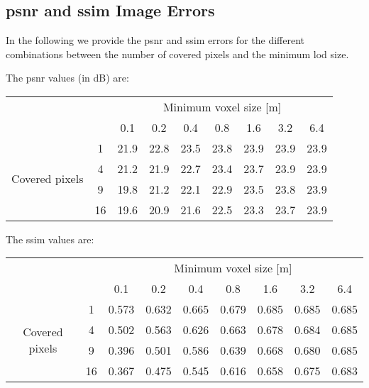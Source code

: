\chapter{}

\section{\acs{psnr} and \acs{ssim} Image Errors}
\label{sec:psnr_and_ssim_errors}
In the following we provide the \ac{psnr} and \ac{ssim} errors for the different combinations between the number of covered pixels and the minimum \ac{lod} size.

The \ac{psnr} values (in dB) are:
\begin{center}
    \begin{tabular}{| c | c | c | c | c | c | c | c | c |}
        \cline{3-9}
        \multicolumn{2}{c|}{} & \multicolumn{7}{c|}{Minimum voxel size [m]} \\
        \cline{3-9}
        \multicolumn{2}{c|}{} & 0.1 & 0.2 & 0.4 & 0.8 & 1.6 & 3.2 & 6.4 \\
        \hline
        \multirow{4}{*}{Covered pixels}& 1 & 21.9 & 22.8 & 23.5 & 23.8 & 23.9 & 23.9 & 23.9 \\
        \cline{2-9}
        & 4 & 21.2 & 21.9 & 22.7 & 23.4 & 23.7 & 23.9 & 23.9 \\
        \cline{2-9}
        & 9 & 19.8 & 21.2 & 22.1 & 22.9 & 23.5 & 23.8 & 23.9 \\
        \cline{2-9}
        & 16 & 19.6 & 20.9 & 21.6 & 22.5 & 23.3 & 23.7 & 23.9 \\
        \hline
    \end{tabular}
\end{center}

The \ac{ssim} values are:
\begin{center}
    \begin{tabular}{| c | c | c | c | c | c | c | c | c |}
        \cline{3-9}
        \multicolumn{2}{c|}{} & \multicolumn{7}{c|}{Minimum voxel size [m]} \\
        \cline{3-9}
        \multicolumn{2}{c|}{} & 0.1 & 0.2 & 0.4 & 0.8 & 1.6 & 3.2 & 6.4 \\
        \hline
        \multirow{4}{*}{Covered pixels}& 1 & 0.573 & 0.632 & 0.665 & 0.679 & 0.685 & 0.685 & 0.685 \\
        \cline{2-9}
        & 4 & 0.502 & 0.563 & 0.626 & 0.663 & 0.678 & 0.684 & 0.685 \\
        \cline{2-9}
        & 9 & 0.396 & 0.501 & 0.586 & 0.639 & 0.668 & 0.680 & 0.685 \\
        \cline{2-9}
        & 16 & 0.367 & 0.475 & 0.545 & 0.616 & 0.658 & 0.675 & 0.683 \\
        \hline
    \end{tabular}
\end{center}